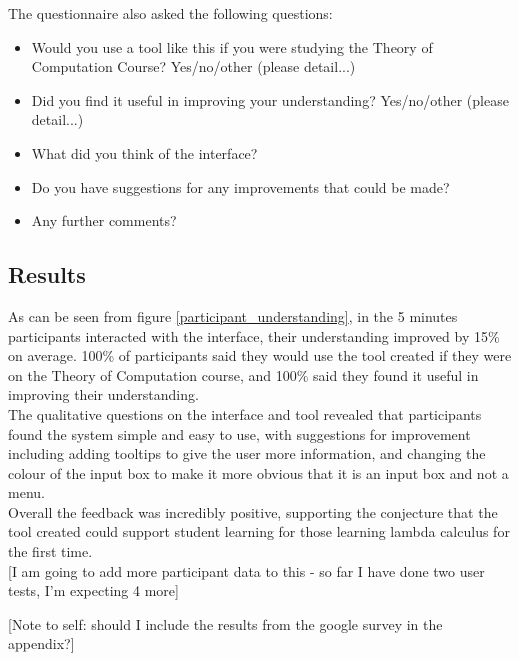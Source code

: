 \documentclass[a4paper,12pt]{report}
\begin{document}
The questionnaire also asked the following questions:
\begin{itemize}
	\item Would you use a tool like this if you were studying the Theory of Computation Course?
	\subitem Yes/no/other (please detail...)
	\item Did you find it useful in improving your understanding?
	\subitem Yes/no/other (please detail...)
	\item What did you think of the interface?
	\item Do you have suggestions for any improvements that could be made?
	\item Any further comments?
\end{itemize}

\subsection{Results}
As can be seen from figure \ref{participant_understanding}, in the 5 minutes participants interacted with the interface, their understanding improved by 15\% on average. 100\% of participants said they would use the tool created if they were on the Theory of Computation course, and 100\% said they found it useful in improving their understanding.\\

The qualitative questions on the interface and tool revealed that participants found the system simple and easy to use, with suggestions for improvement including adding tooltips to give the user more information, and changing the colour of the input box to make it more obvious that it is an input box and not a menu.\\

Overall the feedback was incredibly positive, supporting the conjecture that the tool created could support student learning for those learning lambda calculus for the first time.\\

[I am going to add more participant data to this - so far I have done two user tests, I'm expecting 4 more]

[Note to self: should I include the results from the google survey in the appendix?]
\end{document}
